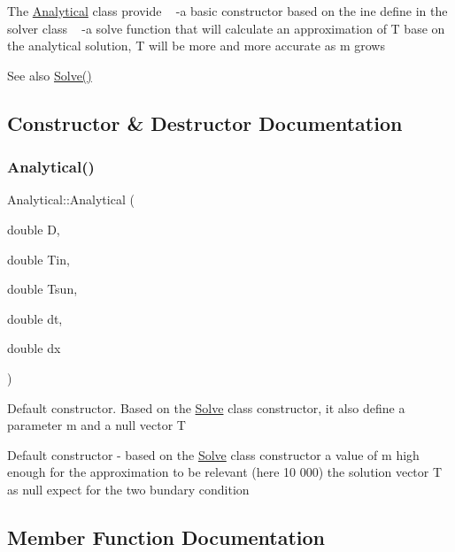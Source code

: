 The \hyperlink{class_analytical}{Analytical} class provide ~\newline
-\/a basic constructor based on the ine define in the solver class ~\newline
-\/a solve function that will calculate an approximation of T base on the analytical solution, T will be more and more accurate as m grows \begin{DoxySeeAlso}{See also}
\hyperlink{class_solve_ac437f1307c9d4669205ac7d370a55ffc}{Solve()} 
\end{DoxySeeAlso}


\subsection{Constructor \& Destructor Documentation}
\mbox{\label{class_analytical_a5a2be7809dfe198c5d6bdc5b6448f75b}} 
\subsubsection{\texorpdfstring{Analytical()}{Analytical()}}
{\footnotesize\ttfamily Analytical\+::\+Analytical (\begin{DoxyParamCaption}\item[{double}]{D,  }\item[{double}]{Tin,  }\item[{double}]{Tsun,  }\item[{double}]{dt,  }\item[{double}]{dx }\end{DoxyParamCaption})}

Default constructor. Based on the \hyperlink{class_solve}{Solve} class constructor, it also define a parameter m and a null vector T

Default constructor -\/  based on the \hyperlink{class_solve}{Solve} class constructor  a value of m high enough for the approximation to be relevant (here 10 000)  the solution vector T as null expect for the two bundary condition 

\subsection{Member Function Documentation}
\mbox{\label{class_analytical_a8fe1d5769bb516115a31719222eb9ae5}} 
